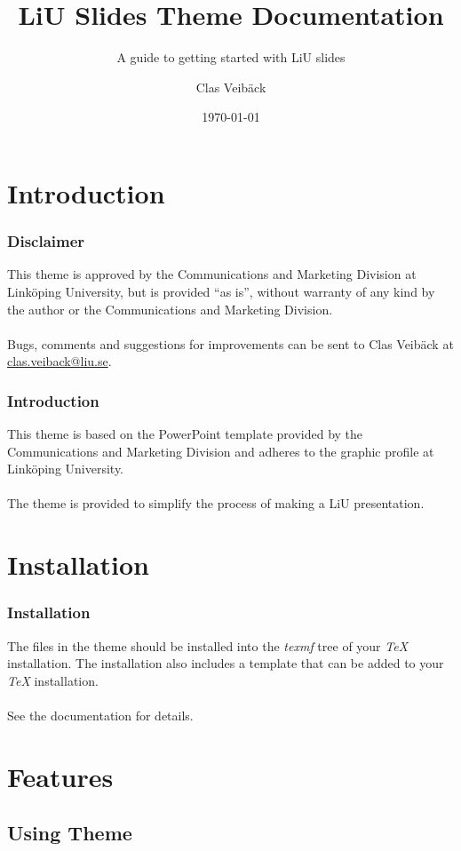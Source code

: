 \documentclass[noamsthm, english]{beamer}%
\title[LiU Slides Documentation]{LiU Slides Theme Documentation}%
\subtitle{A guide to getting started with LiU slides}%
\author{Clas Veibäck}%
\institute{Automatic Control\\%
Department of Electrical Engineering\\%
Linköping University}%
\date{\today}%
\begin{document}
%

\maketitle
\makeoutline

\section{Introduction}

\begin{frame}
\frametitle{Disclaimer}
This theme is approved by the Communications and Marketing Division at Linköping University, but is provided ``as is'', without warranty of any kind by the author or the Communications and Marketing Division.
\\~\\
Bugs, comments and suggestions for improvements can be sent to Clas Veibäck at \href{mailto:clas.veiback@liu.se}{clas.veiback@liu.se}.
\end{frame}

\begin{frame}
\frametitle{Introduction}
This theme is based on the PowerPoint template provided by the Communications and Marketing Division and adheres to the graphic profile at Linköping University.
\\~\\
The theme is provided to simplify the process of making a LiU presentation.
\end{frame}

\section{Installation}

\begin{frame}
\frametitle{Installation}
The files in the theme should be installed into the \emph{texmf} tree of your \emph{TeX} installation. The installation also includes a template that can be added to your \emph{TeX} installation.
\\~\\
See the documentation for details.
\end{frame}

\section{Features}
\subsection{Using Theme}
\end{document}
